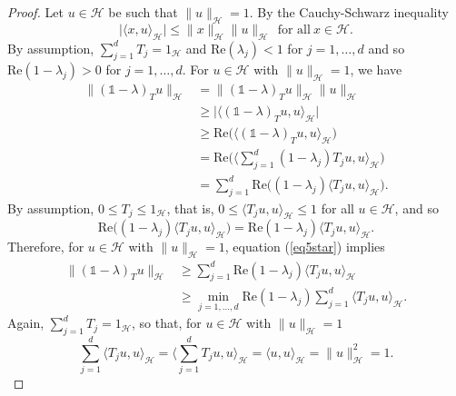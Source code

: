 \documentclass[11pt, reqno]{amsart}
\newcommand\1{\boldsymbol {1}}
\numberwithin{equation}{section}
\begin{document}
\begin{proof}
Let $u\in\mathcal{H}$ be such that $\| u \|_{\mathcal{H}} =1$. By the Cauchy-Schwarz inequality 
$$ \lvert \langle x,u \rangle_{\mathcal{H}} \rvert \leq \| x \|_{\mathcal{H}} \| u \|_{\mathcal{H}}~~\text{for all}~x\in\mathcal{H}.$$
By assumption, $\sum_{j=1}^{d}T_{j}=1_{\mathcal{H}}$ and $\mathrm{Re}(\lambda_{j})<1$ for $j=1,\hdots,d$ and so $\mathrm{Re}(1-\lambda_{j})>0$ for $j=1,\hdots,d$. For $u\in\mathcal{H}$ with $\|u\|_{\mathcal{H}}=1$, we have
\begin{align}
\| (\mathds{1}-\lambda)_{T}u\|_{\mathcal{H}} 	& = \| (\mathds{1}-\lambda)_{T}u\|_{\mathcal{H}} \| u \|_{\mathcal{H}} \nonumber\\
				& \geq \big\lvert \langle (\mathds{1}-\lambda)_{T}u,u \rangle_{\mathcal{H}} \big\rvert 	\nonumber\\
				& \geq \mathrm{Re}\Big(\langle(\mathds{1}-\lambda)_{T}u,u\rangle_{\mathcal{H}}\Big) \nonumber\\
				& = \mathrm{Re}\Bigg(\Big\langle \sum_{j=1}^{d}(1-\lambda_{j})T_{j}u,u\Big\rangle_{\mathcal{H}}\Bigg) \nonumber\\
				& = \sum_{j=1}^{d} \mathrm{Re}\Bigg((1-\lambda_{j})\Big\langle T_{j}u,u\Big\rangle_{\mathcal{H}}\Bigg). \label{eq5star}
\end{align}
By assumption, $0\leq T_{j} \leq 1_{\mathcal{H}}$, that is, $0\leq\langle T_{j}u,u\rangle_{\mathcal{H}}\leq 1$ for all $u\in\mathcal{H}$, and so
$$\mathrm{Re}\Big((1-\lambda_{j})\big\langle T_{j}u,u\big\rangle_{\mathcal{H}}\Big) = \mathrm{Re}(1-\lambda_{j})\big\langle T_{j}u,u\big\rangle_{\mathcal{H}}.$$
Therefore, for $u\in\mathcal{H}$ with $\|u\|_{\mathcal{H}}=1$, equation (\ref{eq5star}) implies
\begin{align}
\| (\mathds{1}-\lambda)_{T}u\|_{\mathcal{H}} & \geq \sum_{j=1}^{d} \mathrm{Re}(1-\lambda_{j})\Big\langle T_{j}u,u\Big\rangle_{\mathcal{H}} \label{anequationwithrealandinner}\\
				& \geq \underset{j=1,\hdots, d}{\min}\mathrm{Re}(1-\lambda_{j}) \sum_{j=1}^{d}\langle T_{j}u,u\rangle_{\mathcal{H}}\nonumber.
\end{align}
Again, $\sum_{j=1}^{d}T_{j}=1_{\mathcal{H}}$, so that, for $u\in\mathcal{H}$ with $\|u\|_{\mathcal{H}}=1$
\begin{equation}\label{anequationwithrealandinner2}
    \sum_{j=1}^{d}\big\langle T_{j}u,u\big\rangle_{\mathcal{H}} = \bigg\langle \sum_{j=1}^{d}T_{j}u,u \bigg\rangle_{\mathcal{H}} = \langle u,u \rangle_{\mathcal{H}} = \| u \|_{\mathcal{H}}^{2}=1.

\end{equation}
\end{proof}
\end{document}
